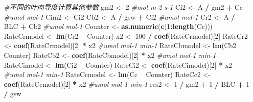 \documentclass[
]{krantz}
\makeatletter
\newenvironment{Shaded}{\begin{snugshade}}{\end{snugshade}}
\newcommand{\CommentTok}[1]{\textcolor[rgb]{0.56,0.35,0.01}{\textit{#1}}}
\newcommand{\DecValTok}[1]{\textcolor[rgb]{0.00,0.00,0.81}{#1}}
\newcommand{\KeywordTok}[1]{\textcolor[rgb]{0.13,0.29,0.53}{\textbf{#1}}}
\newcommand{\NormalTok}[1]{#1}
\newcommand{\OperatorTok}[1]{\textcolor[rgb]{0.81,0.36,0.00}{\textbf{#1}}}
\newcommand{\StringTok}[1]{\textcolor[rgb]{0.31,0.60,0.02}{#1}}
\newenvironment{kframe}{%
\medskip{}
\setlength{\fboxsep}{.8em}
 \def\at@end@of@kframe{}%
 \ifinner\ifhmode%
  \def\at@end@of@kframe{\end{minipage}}%
  \begin{minipage}{\columnwidth}%
 \fi\fi%
 \def\FrameCommand##1{\hskip\@totalleftmargin \hskip-\fboxsep
 \colorbox{shadecolor}{##1}\hskip-\fboxsep
     \hskip-\linewidth \hskip-\@totalleftmargin \hskip\columnwidth}%
 \MakeFramed {\advance\hsize-\width
   \@totalleftmargin\z@ \linewidth\hsize
   \@setminipage}}%
 {\par\unskip\endMakeFramed%
 \at@end@of@kframe}
\renewenvironment{Shaded}{\begin{kframe}}{\end{kframe}}
\makeatother
\begin{document}
\begin{Shaded}
\begin{Highlighting}[]
\CommentTok{#不同的叶肉导度计算其他参数}
\NormalTok{gm2 <-}\StringTok{ }\DecValTok{2} \CommentTok{#mol m-2 s-1}
\NormalTok{Ci2 <-}\StringTok{ }\NormalTok{A }\OperatorTok{/}\StringTok{ }\NormalTok{gm2 }\OperatorTok{+}\StringTok{ }\NormalTok{Cc }\CommentTok{#umol mol-1}
\NormalTok{Cim2 <-}\StringTok{ }\NormalTok{Ci2}
\NormalTok{Cb2 <-}\StringTok{ }\NormalTok{A }\OperatorTok{/}\StringTok{ }\NormalTok{gsw }\OperatorTok{+}\StringTok{ }\NormalTok{Ci2 }\CommentTok{#umol mol-1}
\NormalTok{Cr2 <-}\StringTok{ }\NormalTok{A }\OperatorTok{/}\StringTok{ }\NormalTok{BLC }\OperatorTok{+}\StringTok{ }\NormalTok{Cb2 }\CommentTok{#umol mol-1}
\NormalTok{Counter <-}\StringTok{ }\KeywordTok{as.numeric}\NormalTok{(}\KeywordTok{c}\NormalTok{(}\DecValTok{1}\OperatorTok{:}\KeywordTok{length}\NormalTok{(Cc)))}
\NormalTok{RateCrmodel <-}\StringTok{ }\KeywordTok{lm}\NormalTok{(Cr2 }\OperatorTok{~}\StringTok{ }\NormalTok{Counter)}
\NormalTok{x2 <-}\StringTok{ }\DecValTok{100} \OperatorTok{/}\StringTok{ }\KeywordTok{coef}\NormalTok{(RateCrmodel)[}\DecValTok{2}\NormalTok{] }
\NormalTok{RateCr2 <-}\StringTok{ }\KeywordTok{coef}\NormalTok{(RateCrmodel)[}\DecValTok{2}\NormalTok{] }\OperatorTok{*}\StringTok{ }\NormalTok{x2 }\CommentTok{#umol mol-1 min-1}
\NormalTok{RateCbmodel <-}\StringTok{ }\KeywordTok{lm}\NormalTok{(Cb2 }\OperatorTok{~}\StringTok{ }\NormalTok{Counter)}
\NormalTok{RateCb2 <-}\StringTok{ }\KeywordTok{coef}\NormalTok{(RateCbmodel)[}\DecValTok{2}\NormalTok{] }\OperatorTok{*}\StringTok{ }\NormalTok{x2 }\CommentTok{#umol mol-1 min-1}
\NormalTok{RateCimodel <-}\StringTok{ }\KeywordTok{lm}\NormalTok{(Ci2 }\OperatorTok{~}\StringTok{ }\NormalTok{Counter)}
\NormalTok{RateCi2 <-}\StringTok{ }\KeywordTok{coef}\NormalTok{(RateCimodel)[}\DecValTok{2}\NormalTok{] }\OperatorTok{*}\StringTok{ }\NormalTok{x2 }\CommentTok{#umol mol-1 min-1}
\NormalTok{RateCcmodel <-}\StringTok{ }\KeywordTok{lm}\NormalTok{(Cc }\OperatorTok{~}\StringTok{ }\NormalTok{Counter)}
\NormalTok{RateCc2 <-}\StringTok{ }\KeywordTok{coef}\NormalTok{(RateCcmodel)[}\DecValTok{2}\NormalTok{] }\OperatorTok{*}\StringTok{ }\NormalTok{x2 }\CommentTok{#umol mol-1 min-1}
\NormalTok{res2 <-}\StringTok{ }\DecValTok{1} \OperatorTok{/}\StringTok{ }\NormalTok{gm2 }\OperatorTok{+}\StringTok{ }\DecValTok{1} \OperatorTok{/}\StringTok{ }\NormalTok{BLC }\OperatorTok{+}\StringTok{ }\DecValTok{1} \OperatorTok{/}\StringTok{ }\NormalTok{gsw}


\end{Highlighting}
\end{Shaded}
\end{document}
